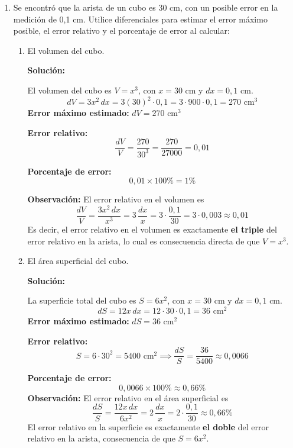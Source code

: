 \documentclass[12pt]{article}
\newcommand{\solucion}{%
    \vspace{0.8em}%
    \textbf{Solución:}%
}
\begin{document}
\begin{enumerate}[label=\alph*.-]
    \item Se encontró que la arista de un cubo es 30 cm, con un posible error en la medición de 0{,}1 cm. Utilice diferenciales para estimar el error máximo posible, el error relativo y el porcentaje de error al calcular:

    \begin{enumerate}[label=\roman*.-]
        \item El volumen del cubo.

        \solucion

        El volumen del cubo es $V = x^3$, con $x = 30$ cm y $dx = 0{,}1$ cm.
        \[
        dV = 3x^2\,dx = 3(30)^2 \cdot 0{,}1 = 3 \cdot 900 \cdot 0{,}1 = 270 \text{ cm}^3
        \]
        \textbf{Error máximo estimado:} $dV = 270 \text{ cm}^3$

        \textbf{Error relativo:}
        \[
        \frac{dV}{V} = \frac{270}{30^3} = \frac{270}{27000} = 0{,}01
        \]

        \textbf{Porcentaje de error:}
        \[
        0{,}01 \times 100\% = 1\%
        \]

        \textbf{Observación:} El error relativo en el volumen es
        \[
        \frac{dV}{V} = \frac{3x^2\,dx}{x^3} = 3\,\frac{dx}{x} = 3 \cdot \frac{0{,}1}{30} = 3 \cdot 0{,}003 \approx 0{,}01
        \]
        Es decir, el error relativo en el volumen es exactamente \textbf{el triple} del error relativo en la arista,
        lo cual es consecuencia directa de que $V = x^3$.

        \item El área superficial del cubo.

        \solucion

        La superficie total del cubo es $S = 6x^2$, con $x = 30$ cm y $dx = 0{,}1$ cm.
        \[
        dS = 12x\,dx = 12 \cdot 30 \cdot 0{,}1 = 36 \text{ cm}^2
        \]
        \textbf{Error máximo estimado:} $dS = 36 \text{ cm}^2$

        \textbf{Error relativo:}
        \[
        S = 6 \cdot 30^2 = 5400 \text{ cm}^2 \implies \frac{dS}{S} = \frac{36}{5400} \approx 0{,}0066
        \]

        \textbf{Porcentaje de error:}
        \[
        0{,}0066 \times 100\% \approx \boxed{0{,}66\%}
        \]
        \textbf{Observación:} El error relativo en el área superficial es
        \[
        \frac{dS}{S} = \frac{12x\,dx}{6x^2} = 2\,\frac{dx}{x} = 2 \cdot \frac{0{,}1}{30} \approx 0{,}66\%
        \]
        El error relativo en la superficie es exactamente \textbf{el doble} del error relativo en la arista,
        consecuencia de que $S = 6x^2$.
    \end{enumerate}
\end{enumerate}
\end{document}
